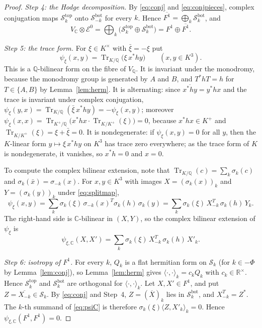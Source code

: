 \documentclass[11pt]{amsart}
\theoremstyle{definition}
\theoremstyle{remark}
\numberwithin{equation}{section}
\newcommand{\Q}{\mathbb{Q}}
\newcommand{\C}{\mathbb{C}}
\newcommand{\R}{\mathbb{R}}
\newcommand{\cS}{\mathcal{S}}
\newcommand{\cE}{\mathcal{E}}
\newcommand{\tp}{\mathrm{top}}
\newcommand{\bt}{\mathrm{bot}}
\DeclareMathOperator{\Tr}{Tr}
\begin{document}
\begin{proof}
\emph{Step 4: the Hodge decomposition.} By \eqref{eq:conj} and \eqref{eq:conjpieces}, complex conjugation maps $\cS_k^{\tp}$ onto $\cS_{-k}^{\bt}$ for every $k$. Hence $\overline{F^1}=\bigoplus_k\cS_k^{\bt}$, and
\[
V_\C\otimes\cE^0=\bigoplus_k\big(\cS_k^{\tp}\oplus\cS_k^{\bt}\big)=F^1\oplus\overline{F^1}.
\]

\emph{Step 5: the trace form.} For $\xi\in K^\times$ with $\bar\xi=-\xi$ put
\[
\psi_\xi(x,y)=\Tr_{K/\Q}\big(\xi\,x^*hy\big)\qquad(x,y\in K^3).
\]
This is a $\Q$-bilinear form on the fibre of $V_\Q$. It is invariant under the monodromy, because the monodromy group is generated by $A$ and $B$, and $T^*hT=h$ for $T\in\{A,B\}$ by Lemma~\ref{lem:herm}. It is alternating: since $\overline{x^*hy}=y^*hx$ and the trace is invariant under complex conjugation, $\psi_\xi(y,x)=\Tr_{K/\Q}(\bar\xi\,x^*hy)=-\psi_\xi(x,y)$; moreover $\psi_\xi(x,x)=\Tr_{K^+/\Q}\big(x^*hx\cdot\Tr_{K/K^+}(\xi)\big)=0$, because $x^*hx\in K^+$ and $\Tr_{K/K^+}(\xi)=\xi+\bar\xi=0$. It is nondegenerate: if $\psi_\xi(x,y)=0$ for all $y$, then the $K$-linear form $y\mapsto\xi\,x^*hy$ on $K^3$ has trace zero everywhere; as the trace form of $K$ is nondegenerate, it vanishes, so $x^*h=0$ and $x=0$.

To compute the complex bilinear extension, note that $\Tr_{K/\Q}(c)=\sum_k\sigma_k(c)$ and $\sigma_k(\bar x)=\sigma_{-k}(x)$. For $x,y\in K^3$ with images $X=(\sigma_k(x))_k$ and $Y=(\sigma_k(y))_k$ under \eqref{eq:splitmap},
\[
\psi_\xi(x,y)=\sum_k\sigma_k(\xi)\,\sigma_{-k}(x)^T\sigma_k(h)\,\sigma_k(y)=\sum_k\sigma_k(\xi)\,X_{-k}^T\,\sigma_k(h)\,Y_k .
\]
The right-hand side is $\C$-bilinear in $(X,Y)$, so the complex bilinear extension of $\psi_\xi$ is
\begin{equation}\label{eq:psiC}
\psi_{\xi,\C}(X,X')=\sum_k\sigma_k(\xi)\,X_{-k}^{T}\,\sigma_k(h)\,X'_k .
\end{equation}

\emph{Step 6: isotropy of $F^1$.} For every $k$, $Q_k$ is a flat hermitian form on $\cS_k$ (for $k\in-\Phi$ by Lemma~\ref{lem:conj}), so Lemma~\ref{lem:herm} gives $\langle\cdot,\cdot\rangle_k=c_kQ_k$ with $c_k\in\R^\times$. Hence $\cS_k^{\tp}$ and $\cS_k^{\bt}$ are orthogonal for $\langle\cdot,\cdot\rangle_k$. Let $X,X'\in F^1$, and put $Z=\overline{X_{-k}}\in\cS_k$. By \eqref{eq:conj} and Step~4, $Z=(\overline X)_k$ lies in $\cS_k^{\bt}$, and $X_{-k}^T=Z^*$. The $k$-th summand of \eqref{eq:psiC} is therefore $\sigma_k(\xi)\langle Z,X'_k\rangle_k=0$. Hence $\psi_{\xi,\C}(F^1,F^1)=0$.


\end{proof}
\end{document}

